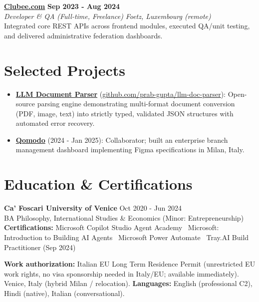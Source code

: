 \documentclass[a4paper,10pt]{article}
\newcommand{\role}[4]{%
  \textbf{#1} \hfill \textbf{#2}\\[1pt]%
  \textit{#3} \hfill \textit{#4}\\[2pt]%
}
\begin{document}
\role{\href{https://clubee.com}{Clubee.com}}{Sep 2023 - Aug 2024}{Developer \& QA (Full-time, Freelance)}{Foetz, Luxembourg (remote)}
Integrated core REST APIs across frontend modules, executed QA/unit testing, and delivered administrative federation dashboards.

\section{Selected Projects}
\begin{itemize}
  \item \textbf{\href{https://github.com/prab-gupta/llm-doc-parser}{LLM Document Parser}} (\href{https://github.com/prab-gupta/llm-doc-parser}{github.com/prab-gupta/llm-doc-parser}): Open-source parsing engine demonstrating multi-format document conversion (PDF, image, text) into strictly typed, validated JSON structures with automated error recovery.
  \item \textbf{\href{https://www.qomodo.me/}{Qomodo}} (2024 - Jan 2025): Collaborator; built an enterprise branch management dashboard implementing Figma specifications in Milan, Italy.
\end{itemize}

\section{Education \& Certifications}
\textbf{Ca' Foscari University of Venice} \hfill Oct 2020 - Jun 2024\\
BA Philosophy, International Studies \& Economics (Minor: Entrepreneurship)\\[1pt]
\textbf{Certifications:} Microsoft Copilot Studio Agent Academy \textbullet\ Microsoft: Introduction to Building AI Agents \textbullet\ Microsoft Power Automate \textbullet\ Tray.AI Build Practitioner (Sep 2024)

\vspace{2pt}
{\small \textbf{Work authorization:} Italian EU Long Term Residence Permit (unrestricted EU work rights, no visa sponsorship needed in Italy/EU; available immediately). Venice, Italy (hybrid Milan / relocation). \quad \textbf{Languages:} English (professional C2), Hindi (native), Italian (conversational).}
\end{document}
